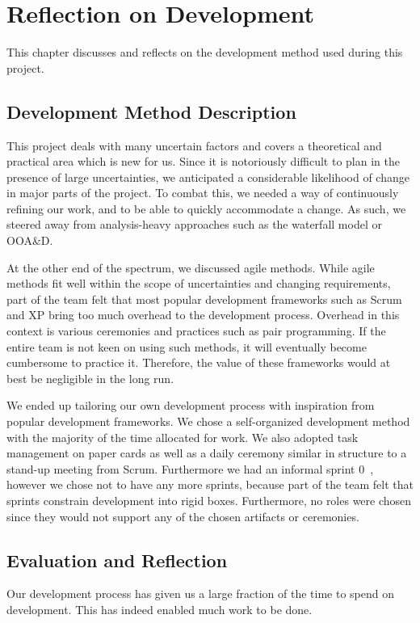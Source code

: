 \chapter{Reflection on Development}\label{chap:devmethodreflection}
This chapter discusses and reflects on the development method used during this project. 

\section{Development Method Description}
This project deals with many uncertain factors and covers a theoretical and practical area which is new for us. Since it is notoriously difficult to plan in the presence of large uncertainties, we anticipated a considerable likelihood of change in major parts of the project. To combat this, we needed a way of continuously refining our work, and to be able to quickly accommodate a change. As such, we steered away from analysis-heavy approaches such as the waterfall model or OOA\&D\@.

At the other end of the spectrum, we discussed agile methods. While agile methods fit well within the scope of uncertainties and changing requirements, part of the team felt that most popular development frameworks such as Scrum and XP bring too much overhead to the development process. Overhead in this context is various ceremonies and practices such as pair programming. If the entire team is not keen on using such methods, it will eventually become cumbersome to practice it. Therefore, the value of these frameworks would at best be negligible in the long run.

We ended up tailoring our own development process with inspiration from popular development frameworks. We chose a self-organized development method with the majority of the time allocated for work. We also adopted task management on paper cards as well as a daily ceremony similar in structure to a stand-up meeting from Scrum. Furthermore we had an informal sprint 0~\cite{sprint-zero}, however we chose not to have any more sprints, because part of the team felt that sprints constrain development into rigid boxes. Furthermore, no roles were chosen since they would not support any of the chosen artifacts or ceremonies.

\section{Evaluation and Reflection}
Our development process has given us a large fraction of the time to spend on development. This has indeed enabled much work to be done. 

